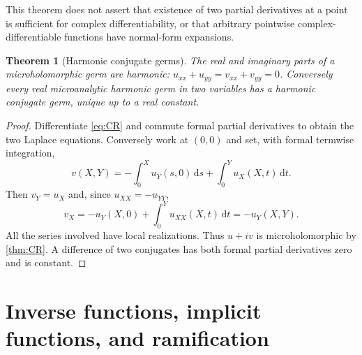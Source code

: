 \documentclass[11pt,letterpaper]{article}
\numberwithin{equation}{section}
\newtheorem{theorem}{Theorem}[section]
\theoremstyle{definition}
\theoremstyle{remark}
\newcommand{\dd}{\,\mathrm d}
\begin{document}
This theorem does not assert that existence of two partial derivatives at
a point is sufficient for complex differentiability, or that arbitrary
pointwise complex-differentiable functions have normal-form expansions.

\begin{theorem}[Harmonic conjugate germs]\label{thm:harmonic}
The real and imaginary parts of a microholomorphic germ are harmonic:
$u_{xx}+u_{yy}=v_{xx}+v_{yy}=0$. Conversely every real microanalytic
harmonic germ in two variables has a harmonic conjugate germ, unique up
to a real constant.
\end{theorem}
\begin{proof}
Differentiate \eqref{eq:CR} and commute formal partial derivatives to
obtain the two Laplace equations. Conversely work at $(0,0)$ and set,
with formal termwise integration,
\[
 v(X,Y)=-\int_0^X u_Y(s,0)\dd s+\int_0^Y u_X(X,t)\dd t.
\]
Then $v_Y=u_X$ and, since $u_{XX}=-u_{YY}$,
\[
 v_X=-u_Y(X,0)+\int_0^Y u_{XX}(X,t)\dd t=-u_Y(X,Y).
\]
All the series involved have local realizations. Thus $u+iv$ is
microholomorphic by \cref{thm:CR}. A difference of two conjugates has
both formal partial derivatives zero and is constant.
\end{proof}

\section{Inverse functions, implicit functions, and ramification}
\label{sec:inverse}
\end{document}
